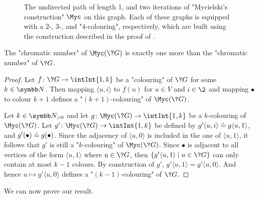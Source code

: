 \begin{figure}
	\centering
	\begin{tikzpicture}
		
	\end{tikzpicture}
	\caption{
		\AP\label{fig:Mycielski}
		The undirected path of length 1,
		and two iterations of "Mycielski's construction" $\Myc$ on this graph.
		Each of these graphs is equipped with a $2$-, $3$-, and "$4$-colouring", respectively, 
		which are built using the construction described in the proof
		of .
	}
\end{figure}

\begin{property}
	\label{prop:chromatic-number}
	The "chromatic number" of $\Myc(\?G)$
	is exactly one more than the "chromatic number" of $\?G$.
\end{property}

\begin{proof}
  Let $f\colon \?G \to \intInt{1,k}$ be a "colouring" of $\?G$ for some $k\in \N$.
  Then mapping $\langle u, i \rangle$ to $f(u)$ for $u \in V$ and $i \in \2$
  and mapping $\bullet$ to colour $k+1$ defines a "$(k+1)$-colouring" of $\Myc(\?G)$.

  Let $k \in \Np$ and let $g\colon \Myc(\?G) \to \intInt{1,k}$ be a
  $k$-colouring of $\Myc(\?G)$.
  Let $g'\colon \Myc(\?G) \to \intInt{1,k}$
  be defined by $g'\langle u,i\rangle \mathrel{\hat{=}} g\langle u,1 \rangle$,
  and $g'(\bullet) \mathrel{\hat{=}} g(\bullet)$.
  Since the adjacency of $\langle u,0 \rangle$ is included in the
  one of $\langle u,1 \rangle$, it follows that $g'$ is still a "$k$-colouring"
  of $\Myc(\?G)$. Since $\bullet$ is adjacent to all vertices of the form $\langle u, 1\rangle$
  where $u\in \?G$, then $\{g'\langle u, 1\rangle \mid u \in \?G\}$ can only contain at most $k-1$ colours.
  By construction of $g'$, $g'\langle u, 1\rangle = g'\langle u, 0\rangle$.
  And hence $u \mapsto g' \langle u,0 \rangle$ defines a "$(k-1)$-colouring" of $\?G$.
\end{proof}

We can now prove our result.


